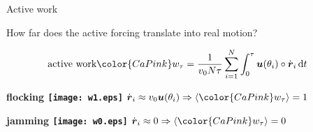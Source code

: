 \documentclass{beamer}
\begin{document}
\begin{frame}{Active work}

\begin{center}
How far does the active forcing translate into real motion?
\end{center}

\pause
\begin{eqnarray}
\text{active work}& {\color{CaPink} w_{\tau}} = \frac{1}{v_0 N \tau} \sum_{i=1}^N \int_0^{\tau} \boldsymbol{u}(\theta_i) \circ \dot{\boldsymbol{r}}_i \, \mathrm{d}t
\end{eqnarray}
\pause

\return
\hfill
\begin{minipage}{0.4\linewidth}
\centering
\bf flocking
\texttt{[image: w1.eps]}
$\dot{\boldsymbol{r}}_i \approx v_0 \boldsymbol{u}(\theta_i) \Rightarrow \left<{\color{CaPink} w_{\tau}}\right> = 1$
\end{minipage}
\hfill
\begin{minipage}{0.4\linewidth}
\centering
\bf jamming
\texttt{[image: w0.eps]}
$\dot{\boldsymbol{r}}_i \approx 0 \Rightarrow \left<{\color{CaPink} w_{\tau}}\right> = 0$
\end{minipage}
\hfill\hfill

\end{frame}
\end{document}
